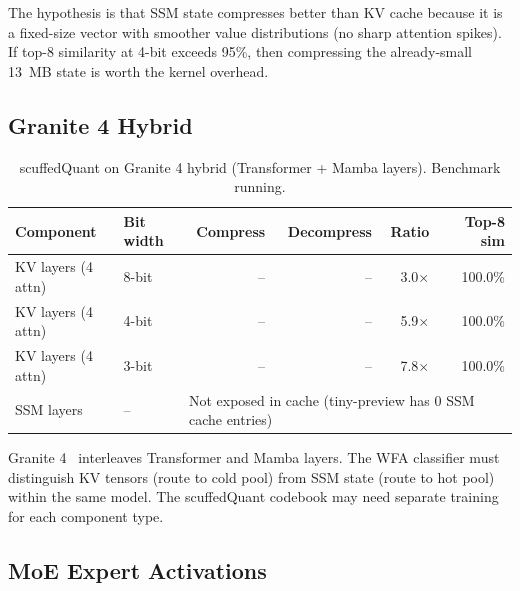 \documentclass[11pt,letterpaper]{article}
\begin{document}
The hypothesis is that SSM state compresses better than KV cache because it is a fixed-size vector with smoother value distributions (no sharp attention spikes). If top-8 similarity at 4-bit exceeds 95\%, then compressing the already-small 13~MB state is worth the kernel overhead.

\subsection{Granite 4 Hybrid}
\label{sec:sq_granite4}

\begin{table}[ht]
\centering\small
\begin{tabular}{llrrrr}
\toprule
\textbf{Component} & \textbf{Bit width} & \textbf{Compress} & \textbf{Decompress} & \textbf{Ratio} & \textbf{Top-8 sim} \\
\midrule
KV layers (4 attn) & 8-bit & -- & -- & 3.0$\times$ & 100.0\% \\
KV layers (4 attn) & 4-bit & -- & -- & 5.9$\times$ & 100.0\% \\
KV layers (4 attn) & 3-bit & -- & -- & 7.8$\times$ & 100.0\% \\
SSM layers & -- & \multicolumn{4}{l}{Not exposed in cache (tiny-preview has 0 SSM cache entries)} \\
\bottomrule
\end{tabular}
\caption{scuffedQuant on Granite 4 hybrid (Transformer + Mamba layers). Benchmark running.}
\label{tab:sq_granite4}
\end{table}

Granite 4~\cite{ibm2026granite4} interleaves Transformer and Mamba layers. The WFA classifier must distinguish KV tensors (route to cold pool) from SSM state (route to hot pool) within the same model. The scuffedQuant codebook may need separate training for each component type.

\subsection{MoE Expert Activations}
\label{sec:sq_moe}
\end{document}
